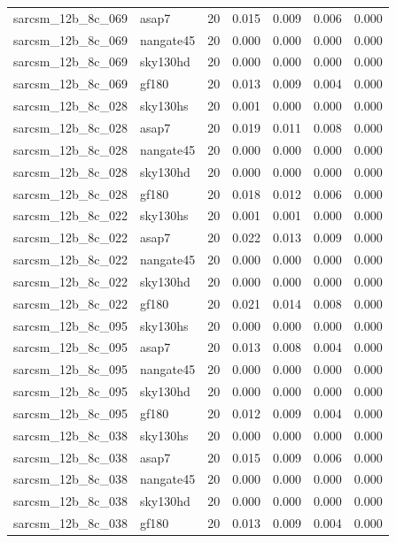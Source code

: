 \begin{tabular}{llrrrrr}
sarcsm\_12b\_8c\_069 & asap7 & 20 & 0.015 & 0.009 & 0.006 & 0.000 \\
sarcsm\_12b\_8c\_069 & nangate45 & 20 & 0.000 & 0.000 & 0.000 & 0.000 \\
sarcsm\_12b\_8c\_069 & sky130hd & 20 & 0.000 & 0.000 & 0.000 & 0.000 \\
sarcsm\_12b\_8c\_069 & gf180 & 20 & 0.013 & 0.009 & 0.004 & 0.000 \\
sarcsm\_12b\_8c\_028 & sky130hs & 20 & 0.001 & 0.000 & 0.000 & 0.000 \\
sarcsm\_12b\_8c\_028 & asap7 & 20 & 0.019 & 0.011 & 0.008 & 0.000 \\
sarcsm\_12b\_8c\_028 & nangate45 & 20 & 0.000 & 0.000 & 0.000 & 0.000 \\
sarcsm\_12b\_8c\_028 & sky130hd & 20 & 0.000 & 0.000 & 0.000 & 0.000 \\
sarcsm\_12b\_8c\_028 & gf180 & 20 & 0.018 & 0.012 & 0.006 & 0.000 \\
sarcsm\_12b\_8c\_022 & sky130hs & 20 & 0.001 & 0.001 & 0.000 & 0.000 \\
sarcsm\_12b\_8c\_022 & asap7 & 20 & 0.022 & 0.013 & 0.009 & 0.000 \\
sarcsm\_12b\_8c\_022 & nangate45 & 20 & 0.000 & 0.000 & 0.000 & 0.000 \\
sarcsm\_12b\_8c\_022 & sky130hd & 20 & 0.000 & 0.000 & 0.000 & 0.000 \\
sarcsm\_12b\_8c\_022 & gf180 & 20 & 0.021 & 0.014 & 0.008 & 0.000 \\
sarcsm\_12b\_8c\_095 & sky130hs & 20 & 0.000 & 0.000 & 0.000 & 0.000 \\
sarcsm\_12b\_8c\_095 & asap7 & 20 & 0.013 & 0.008 & 0.004 & 0.000 \\
sarcsm\_12b\_8c\_095 & nangate45 & 20 & 0.000 & 0.000 & 0.000 & 0.000 \\
sarcsm\_12b\_8c\_095 & sky130hd & 20 & 0.000 & 0.000 & 0.000 & 0.000 \\
sarcsm\_12b\_8c\_095 & gf180 & 20 & 0.012 & 0.009 & 0.004 & 0.000 \\
sarcsm\_12b\_8c\_038 & sky130hs & 20 & 0.000 & 0.000 & 0.000 & 0.000 \\
sarcsm\_12b\_8c\_038 & asap7 & 20 & 0.015 & 0.009 & 0.006 & 0.000 \\
sarcsm\_12b\_8c\_038 & nangate45 & 20 & 0.000 & 0.000 & 0.000 & 0.000 \\
sarcsm\_12b\_8c\_038 & sky130hd & 20 & 0.000 & 0.000 & 0.000 & 0.000 \\
sarcsm\_12b\_8c\_038 & gf180 & 20 & 0.013 & 0.009 & 0.004 & 0.000 \\

\end{tabular}

